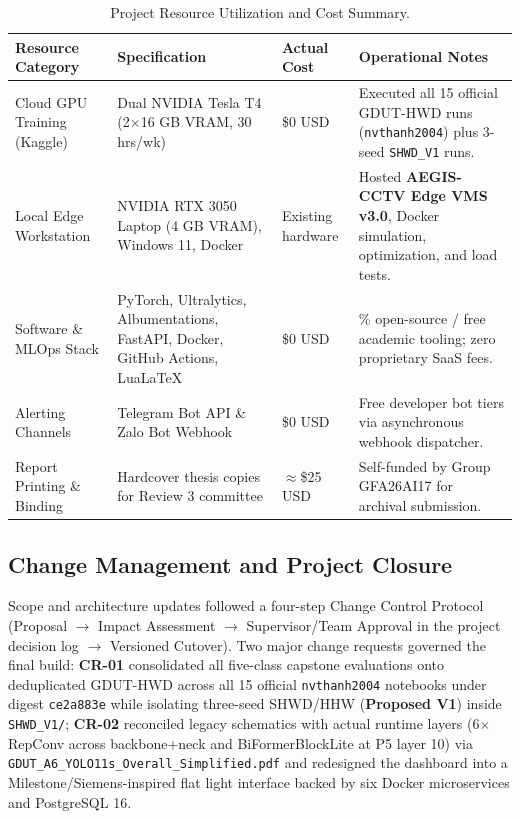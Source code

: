 \begin{table}[htbp]
\centering
\caption{Project Resource Utilization and Cost Summary.}
\label{tab:ch2_budget}
\footnotesize
\renewcommand{\arraystretch}{1.12}
\begin{tabularx}{\textwidth}{|>{\raggedright\arraybackslash}p{3.4cm}|>{\raggedright\arraybackslash}p{3.4cm}|>{\raggedright\arraybackslash}p{2.2cm}|>{\raggedright\arraybackslash}X|}
\hline
\rowcolor{slatehdr}
\textbf{Resource Category} & \textbf{Specification} & \textbf{Actual Cost} & \textbf{Operational Notes} \\
\hline
Cloud GPU Training (Kaggle) & Dual NVIDIA Tesla T4 (2$\times$16 GB VRAM, 30 hrs/wk) & \$0 USD & Executed all 15 official GDUT-HWD runs (\texttt{nvthanh2004}) plus 3-seed \texttt{SHWD\_V1} runs. \\
\hline
Local Edge Workstation & NVIDIA RTX 3050 Laptop (4 GB VRAM), Windows 11, Docker & Existing hardware & Hosted \textbf{AEGIS-CCTV Edge VMS v3.0}, Docker simulation, optimization, and load tests. \\
\hline
Software \& MLOps Stack & PyTorch, Ultralytics, Albumentations, FastAPI, Docker, GitHub Actions, LuaLaTeX & \$0 USD & 100\% open-source / free academic tooling; zero proprietary SaaS fees. \\
\hline
Alerting Channels & Telegram Bot API \& Zalo Bot Webhook & \$0 USD & Free developer bot tiers via asynchronous webhook dispatcher. \\
\hline
Report Printing \& Binding & Hardcover thesis copies for Review 3 committee & $\approx$\$25 USD & Self-funded by Group GFA26AI17 for archival submission. \\
\hline
\end{tabularx}
\end{table}

\subsection{Change Management and Project Closure}

Scope and architecture updates followed a four-step Change Control Protocol (Proposal $\rightarrow$ Impact Assessment $\rightarrow$ Supervisor/Team Approval in the project decision log $\rightarrow$ Versioned Cutover). Two major change requests governed the final build: \textbf{CR-01} consolidated all five-class capstone evaluations onto deduplicated GDUT-HWD across all 15 official \texttt{nvthanh2004} notebooks under digest \texttt{ce2a883e} while isolating three-seed SHWD/HHW (\textbf{Proposed V1}) inside \texttt{SHWD\_V1/}; \textbf{CR-02} reconciled legacy schematics with actual runtime layers (6$\times$RepConv across backbone+neck and BiFormerBlockLite at P5 layer 10) via \nolinkurl{GDUT_A6_YOLO11s_Overall_Simplified.pdf} and redesigned the dashboard into a Milestone/Siemens-inspired flat light interface backed by six Docker microservices and PostgreSQL 16.

